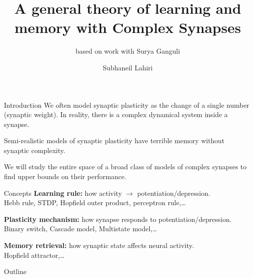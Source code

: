 \documentclass{beamer}%
\title[Complex synapses]{A general theory of learning and memory with Complex Synapses}
\subtitle{\small{based on work with Surya Ganguli}
}
\author{Subhaneil Lahiri%
}
\institute[Stanford]{%
Stanford University, Applied Physics
}
\begin{document}

\begin{frame}
%
 \titlepage
%
\end{frame}


\begin{frame}{Introduction}
%
 We often model synaptic plasticity as the change of a single number (synaptic weight).
 In reality, there is a complex dynamical system inside a synapse.

 \vp Semi-realistic models of synaptic plasticity have terrible memory without synaptic complexity.

 \vp We will study the entire space of a broad class of models of complex synapses to find upper bounds on their performance.

%
\end{frame}


\begin{frame}{Concepts}
%
 \textbf{Learning rule:} how activity $\to$ potentiation/depression.\\
 \hp \eg Hebb rule, STDP, Hopfield outer product, perceptron rule,\ldots

 \vp \textbf{Plasticity mechanism:} how synapse responds to potentiation/depression.\\
 \hp \eg Binary switch, Cascade model, Multistate model,\ldots

 \vp \textbf{Memory retrieval:} how synaptic state affects neural activity.\\
 \hp \eg Hopfield attractor,\ldots

%
\end{frame}


\begin{frame}{Outline}
%
 \tableofcontents[hideallsubsections]
%
\end{frame}
\end{document}

